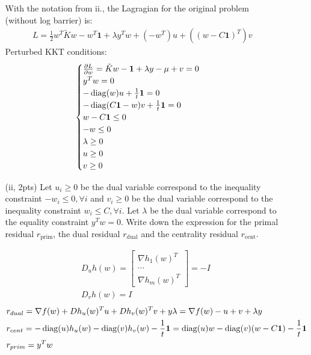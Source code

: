 \documentclass{article}
\theoremstyle{remark}
\theoremstyle{definition}
\newcommand{\diag}{\mathop{\rm diag}}
\begin{document}
\begin{enumerate}[(a)]
\begin{enumerate}[(i)]
{      With the notation from ii., the Lagragian for the original problem (without log barrier) is:
      \begin{align*}
          L = \frac{1}{2}w^T \tilde{K} w - w^T \mathbf{1} + \lambda y^T w + (-w^T)u + ((w-C\mathbf{1})^T)v
      \end{align*}
      Perturbed KKT conditions:
      \begin{align*}
          \begin{cases}
          \frac{\partial L}{\partial w}=\tilde{K}w-\mathbf{1}+\lambda y-\mu +v = 0 \\
          y^T w = 0 \\
          -\diag (w)u + \frac{1}{t}\mathbf{1} = 0 \\
          -\diag (C\mathbf{1}-w)v + \frac{1}{t}\mathbf{1} = 0 \\
          w-C\mathbf{1}\leq 0 \\
          -w \leq 0 \\
          \lambda \geq 0 \\
          u\geq 0 \\
          v\geq 0
          \end{cases}
      \end{align*}
      }

        \item[(ii, 2pts)] Let $u_i \geq 0$ be the dual variable correspond to the inequality constraint $-w_i \leq 0, \forall i$ and $v_i\geq 0$ be the dual variable correspond to the inequality constraint $w_i\leq C, \forall i$. Let $\lambda$ be the dual variable correspond to the equality constraint $y^Tw = 0$. Write down the expression for the primal residual $r_{\text{prim}}$, the dual residual $r_{\text{dual}}$ and the centrality residual $r_{\text{cent}}$.
        
        {
        \color{blue}
        \begin{align*}
            &D_u h(w) = 
            \begin{bmatrix}
            \nabla h_1(w)^T \\
            \cdots \\
            \nabla h_m(w)^T
            \end{bmatrix} = 
            -I \\
            &D_v h(w) = I
        \end{align*}
        \begin{align*}
            &r_{dual} = \nabla f(w) + Dh_u(w)^T u + Dh_v(w)^T v + y\lambda = \nabla f(w) - u + v + \lambda y \\
            &r_{cent} = -\diag(u)h_u(w)-\diag(v)h_v(w)-\frac{1}{t}\mathbf{1}=\diag(u)w-\diag(v)(w-C\mathbf{1})-\frac{1}{t}\mathbf{1} \\
            &r_{prim} = y^T w
        \end{align*}
        }


\end{enumerate}
\end{enumerate}
\end{document}
